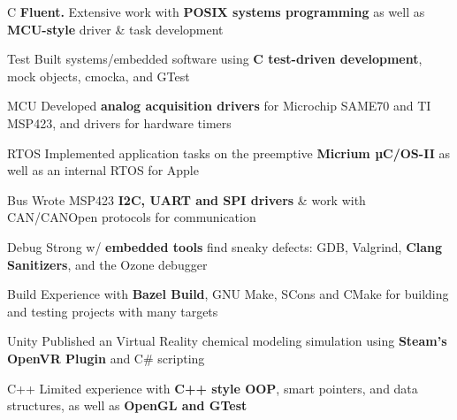 \begin{cvskills}

 \cvskill
    {C} %
    {\textbf{Fluent.} Extensive work with \textbf{POSIX systems programming} as well as \textbf{MCU-style} driver \& task development}%

 \cvskill
    {Test} %
    {Built systems/embedded software using \textbf{C test-driven development}, mock objects, cmocka, and GTest} %

 \cvskill
    {MCU} %
    {Developed \textbf{analog acquisition drivers} for Microchip SAME70 and TI MSP423, and drivers for hardware timers} %

 \cvskill
    {RTOS} %
    {Implemented application tasks on the preemptive \textbf{Micrium µC/OS-II} as well as an internal RTOS for Apple  } %

 \cvskill
    {Bus} %
    {Wrote MSP423 \textbf{I2C, UART and SPI drivers} \& work with CAN/CANOpen protocols for communication}

 \cvskill
    {Debug} %
    {Strong w/ \textbf{embedded tools} find sneaky defects: GDB, Valgrind, \textbf{Clang Sanitizers}, and the Ozone debugger} %

 \cvskill
    {Build} %
    {Experience with \textbf{Bazel Build}, GNU Make, SCons and CMake for building and testing projects with many targets} %


 \cvskill
    {Unity} %
    {Published an Virtual Reality chemical modeling simulation using \textbf{Steam's OpenVR Plugin} and C\# scripting}


 \cvskill
    {C++} %
    {Limited experience with \textbf{C++ style OOP}, smart pointers, and data structures, as well as \textbf{OpenGL and GTest}}%
    




\end{cvskills}

